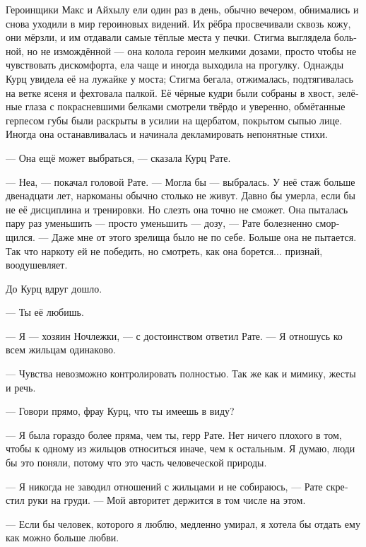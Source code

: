 \documentclass[a4paper,12pt,fleqn]{book}\usepackage{polyglossia}\setdefaultlanguage[babelshorthands=true]{russian}\setotherlanguage{english}\defaultfontfeatures{Ligatures=TeX,Mapping=tex-text}\usepackage{xcolor}\newcommand{\ml}[3]{#2}
\begin{document}
Героинщики Макс и Айхылу ели один раз в день, обычно вечером, обнимались и снова уходили в мир героиновых видений.
Их рёбра просвечивали сквозь кожу, они мёрзли, и им отдавали самые тёплые места у печки.
Стигма выглядела больной, но не измождённой --- она колола героин мелкими дозами, просто чтобы не чувствовать дискомфорта, ела чаще и иногда выходила на прогулку.
Однажды Курц увидела её на лужайке у моста;
Стигма бегала, отжималась, подтягивалась на ветке ясеня и фехтовала палкой.
Её чёрные кудри были собраны в хвост, зелёные глаза с покрасневшими белками смотрели твёрдо и уверенно, обмётанные герпесом губы были раскрыты в усилии на щербатом, покрытом сыпью лице.
Иногда она останавливалась и начинала декламировать непонятные стихи.

\ml{$0$}
{--- Она ещё может выбраться, --- сказала Курц Рате.}
{``She still can get clean,'' Kurz said to Rate.}

\ml{$0$}
{--- Неа, --- покачал головой Рате.}
{``Nah,'' Rate shook his head.}
\ml{$0$}
{--- Могла бы --- выбралась.}
{``She would've if she could.}
У неё стаж больше двенадцати лет, наркоманы обычно столько не живут.
Давно бы умерла, если бы не её дисциплина и тренировки.
Но слезть она точно не сможет.
Она пыталась пару раз уменьшить --- просто уменьшить --- дозу, --- Рате болезненно сморщился.
--- Даже мне от этого зрелища было не по себе.
Больше она не пытается.
Так что наркоту ей не победить, но смотреть, как она борется... признай, воодушевляет.

До Курц вдруг дошло.

\ml{$0$}
{--- Ты её любишь.}
{``You love her.''}

--- Я --- хозяин Ночлежки, --- с достоинством ответил Рате.
--- Я отношусь ко всем жильцам одинаково.

--- Чувства невозможно контролировать полностью.
Так же как и мимику, жесты и речь.

--- Говори прямо, фрау Курц, что ты имеешь в виду?

--- Я была гораздо более пряма, чем ты, герр Рате.
Нет ничего плохого в том, чтобы к одному из жильцов относиться иначе, чем к остальным.
Я думаю, люди бы это поняли, потому что это часть человеческой природы.

--- Я никогда не заводил отношений с жильцами и не собираюсь, --- Рате скрестил руки на груди.
--- Мой авторитет держится в том числе на этом.

\ml{$0$}
{--- Если бы человек, которого я люблю, медленно умирал, я хотела бы отдать ему как можно больше любви.}
{``If the one I love was slowly dying, I'd give them as much love as I could.''}
\end{document}
